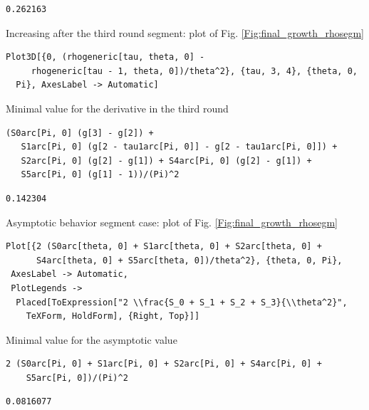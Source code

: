 \documentclass[reqno]{amsart}
\theoremstyle{definition} \newtheorem{definition}{Definition}[section]
\theoremstyle{definition} \newtheorem{remark}[definition]{Remark}
\theoremstyle{plain} \newtheorem{lemma}[definition]{Lemma}
\theoremstyle{plain} \newtheorem{proposition}[definition]{Proposition}
\theoremstyle{plain} \newtheorem{theorem}[definition]{Theorem}
\theoremstyle{plain} \newtheorem{corollary}[definition]{Corollary}
\theoremstyle{definition} \newtheorem{example}[definition]{Example}
\theoremstyle{plain} \newtheorem{claim}[clai]{Claim}
\theoremstyle{definition} \newtheorem{assumption}[definition]{Assumption}
\theoremstyle{definition} \newtheorem{observation}[definition]{Observation}
\newcommand{\1}{\mathbbm 1}
\numberwithin{equation}{section} %
\theoremstyle{plain} \newtheorem*{theorem*}{Theorem}
\theoremstyle{plain} \newtheorem{mthm}[maintheorem]{Main Theorem}
\theoremstyle{plain} \newtheorem*{mthm*}{Main Theorem}
\theoremstyle{plain} \newtheorem*{conjecture*}{Conjecture}
\theoremstyle{plain} \newtheorem{conjecture}[definition]{Conjecture}
\theoremstyle{plain} \newtheorem*{problem*}{Problem}
\begin{document}
\begin{verbatim}
0.262163
\end{verbatim}
\medskip
Increasing after the third round segment: plot of Fig. \ref{Fig:final_growth_rhosegm}
\medskip
\begin{verbatim}
Plot3D[{0, (rhogeneric[tau, theta, 0] - 
     rhogeneric[tau - 1, theta, 0])/theta^2}, {tau, 3, 4}, {theta, 0, 
  Pi}, AxesLabel -> Automatic]
\end{verbatim}
\medskip
Minimal value for the derivative in the third round
\medskip
\begin{verbatim}
(S0arc[Pi, 0] (g[3] - g[2]) + 
   S1arc[Pi, 0] (g[2 - tau1arc[Pi, 0]] - g[2 - tau1arc[Pi, 0]]) + 
   S2arc[Pi, 0] (g[2] - g[1]) + S4arc[Pi, 0] (g[2] - g[1]) + 
   S5arc[Pi, 0] (g[1] - 1))/(Pi)^2
\end{verbatim}
\begin{verbatim}
0.142304
\end{verbatim}
\medskip
Asymptotic behavior segment case: plot of Fig. \ref{Fig:final_growth_rhosegm}
\medskip
\begin{verbatim}
Plot[{2 (S0arc[theta, 0] + S1arc[theta, 0] + S2arc[theta, 0] + 
      S4arc[theta, 0] + S5arc[theta, 0])/theta^2}, {theta, 0, Pi}, 
 AxesLabel -> Automatic, 
 PlotLegends -> 
  Placed[ToExpression["2 \\frac{S_0 + S_1 + S_2 + S_3}{\\theta^2}", 
    TeXForm, HoldForm], {Right, Top}]]
\end{verbatim}
\medskip
Minimal value for the asymptotic value
\medskip
\begin{verbatim}
2 (S0arc[Pi, 0] + S1arc[Pi, 0] + S2arc[Pi, 0] + S4arc[Pi, 0] + 
    S5arc[Pi, 0])/(Pi)^2
\end{verbatim}
\begin{verbatim}
0.0816077
\end{verbatim}

\bigskip


\bigskip
\end{document}

